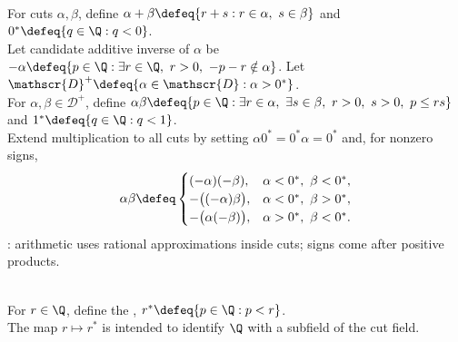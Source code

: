 \begin{definition} \label{def:cut-arithmetic} \\
For cuts $\alpha,\beta$, define $\alpha+\beta\defeq\{r+s:r\in\alpha,\ s\in\beta\}$ and $0^*\defeq\{q\in\Q:q<0\}$.\\
Let candidate additive inverse of $\alpha$ be $-\alpha\defeq\{p\in\Q:\exists r\in\Q,\ r>0,\ -p-r\notin\alpha\}$. Let $\mathscr{D}^+\defeq\{\alpha\in\mathscr{D}:\alpha>0^*\}$.\\
For $\alpha,\beta\in\mathscr{D}^+$, define $\alpha\beta\defeq\{p\in\Q:\exists r\in\alpha,\ \exists s\in\beta,\ r>0,\ s>0,\ p\leq rs\}$ and $1^*\defeq\{q\in\Q:q<1\}$.\\
Extend multiplication to all cuts by setting $\alpha0^*=0^*\alpha=0^*$ and, for nonzero signs,
\begin{align}
\alpha\beta \defeq
\begin{cases}
(-\alpha)(-\beta), & \alpha<0^*,\ \beta<0^*,\\
-\bigl((-\alpha)\beta\bigr), & \alpha<0^*,\ \beta>0^*,\\
-\bigl(\alpha(-\beta)\bigr), & \alpha>0^*,\ \beta<0^*.
\end{cases} \nonumber
\end{align}
: arithmetic uses rational approximations inside cuts; signs come after positive products.
\end{definition}

\begin{definition} \label{def:rational-cuts} \\
For $r\in\Q$, define the , $r^*\defeq\{p\in\Q:p<r\}$.\\
The map $r\mapsto r^*$ is intended to identify $\Q$ with a subfield of the cut field.
\end{definition}

